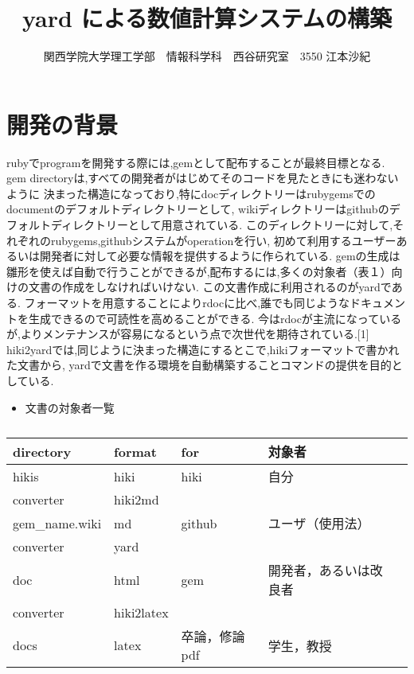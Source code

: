 \documentclass[10pt,a4j,twocolumn]{jsarticle}
\begin{document}
\title{yard による数値計算システムの構築}
\author{関西学院大学理工学部　情報科学科　西谷研究室　3550 江本沙紀}
\date{}
\maketitle
\section{開発の背景}
rubyでprogramを開発する際には,gemとして配布することが最終目標となる.
gem directoryは,すべての開発者がはじめてそのコードを見たときにも迷わないように
決まった構造になっており,特にdocディレクトリーはrubygemsでのdocumentのデフォルトディレクトリーとして,
wikiディレクトリーはgithubのデフォルトディレクトリーとして用意されている.
このディレクトリーに対して,それぞれのrubygems,githubシステムがoperationを行い,
初めて利用するユーザーあるいは開発者に対して必要な情報を提供するように作られている.
gemの生成は雛形を使えば自動で行うことができるが,配布するには,多くの対象者（表１）向けの文書の作成をしなければいけない.
この文書作成に利用されるのがyardである.
フォーマットを用意することによりrdocに比べ,誰でも同じようなドキュメントを生成できるので可読性を高めることができる.
今はrdocが主流になっているが,よりメンテナンスが容易になるという点で次世代を期待されている.[1]
hiki2yardでは,同じように決まった構造にするとこで,hikiフォーマットで書かれた文書から,
yardで文書を作る環境を自動構築することコマンドの提供を目的としている.
\begin{itemize}
\item 文書の対象者一覧
\end{itemize}
\begin{table}[htbp]\begin{center}
\caption{}
\begin{tabular}{lllll}
\hline
directory  &format  &for   &対象者  \\ \hline
hikis   &hiki   &hiki   &自分  \\
converter   &hiki2md  \\
gem\_name.wiki   &md   &github  &ユーザ（使用法）  \\
converter   &yard  \\
doc   &html   &gem   &開発者，あるいは改良者  \\
converter   &hiki2latex  \\
docs   &latex   &卒論，修論pdf   &学生，教授  \\
\hline
\end{tabular}
\label{default}
\end{center}\end{table}
\end{document}

